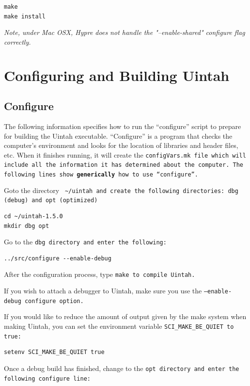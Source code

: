 \documentclass[12pt]{article}
\newcommand{\TT}[1]{\tt{#1} \normalfont}
\begin{document}
\begin{verbatim}
make
make install
\end{verbatim}

\emph{Note, under Mac OSX, Hypre does not handle the "--enable-shared" configure
  flag correctly.}

\section{Configuring and Building Uintah}

\subsection{Configure}

The following information specifies how to run the ``configure''
script to prepare for building the Uintah executable.  ``Configure''
is a program that checks the computer's environment and looks for the
location of libraries and header files, etc.  When it finishes
running, it will create the \TT{configVars.mk} file which will include
all the information it has determined about the computer.  The
following lines show \textbf{generically} how to use ``configure''.

Goto the directory \TT{ \textasciitilde/uintah} and create the
following directories: \TT{dbg} (debug) and \TT{opt} (optimized)

\begin{verbatim}
cd ~/uintah-1.5.0
mkdir dbg opt
\end{verbatim}

Go to the \TT{dbg} directory and enter the following:

\begin{verbatim}
../src/configure --enable-debug        
\end{verbatim}


After the configuration process, type \TT{make} to compile Uintah.

If you wish to attach a debugger to Uintah, make sure you use the
\TT{--enable-debug} configure option.

If you would like to reduce the amount of output given by the make
system when making Uintah, you can set the environment variable
\TT{SCI\_MAKE\_BE\_QUIET} to true:

\begin{verbatim}
setenv SCI_MAKE_BE_QUIET true
\end{verbatim}

Once a debug build has finished, change to the \TT{opt} directory and
enter the following configure line:
\end{document}
